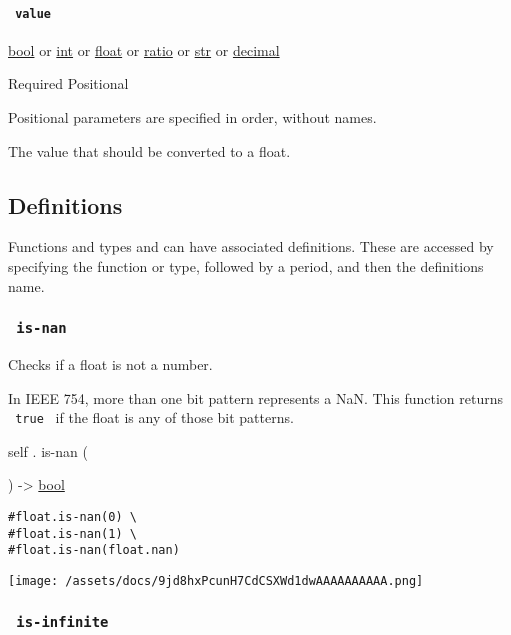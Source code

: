\paragraph{\texorpdfstring{\texttt{\ value\ }}{ value }}\label{constructor-value}

\href{/docs/reference/foundations/bool/}{bool} {or}
\href{/docs/reference/foundations/int/}{int} {or}
\href{/docs/reference/foundations/float/}{float} {or}
\href{/docs/reference/layout/ratio/}{ratio} {or}
\href{/docs/reference/foundations/str/}{str} {or}
\href{/docs/reference/foundations/decimal/}{decimal}

{Required} {{ Positional }}

\label{constructor-value-positional-tooltip}
Positional parameters are specified in order, without names.

The value that should be converted to a float.

\subsection{\texorpdfstring{{ Definitions
}}{ Definitions }}\label{definitions}

\label{definitions-tooltip}
Functions and types and can have associated definitions. These are
accessed by specifying the function or type, followed by a period, and
then the definition\textquotesingle s name.

\subsubsection{\texorpdfstring{\texttt{\ is-nan\ }}{ is-nan }}\label{definitions-is-nan}

Checks if a float is not a number.

In IEEE 754, more than one bit pattern represents a NaN. This function
returns \texttt{\ true\ } if the float is any of those bit patterns.

self { . } { is-nan } (

) -\textgreater{} \href{/docs/reference/foundations/bool/}{bool}

\begin{verbatim}
#float.is-nan(0) \
#float.is-nan(1) \
#float.is-nan(float.nan)
\end{verbatim}

\texttt{[image: /assets/docs/9jd8hxPcunH7CdCSXWd1dwAAAAAAAAAA.png]}

\subsubsection{\texorpdfstring{\texttt{\ is-infinite\ }}{ is-infinite }}\label{definitions-is-infinite}

